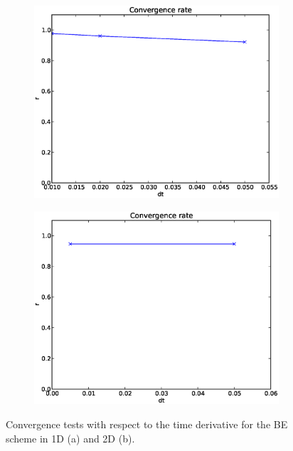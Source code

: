 \begin{figure}[h]
\centering
 \begin{subfigure}{0.49\textwidth}
  \includegraphics[width=\textwidth]{../results/experiment_14052014_0744_errorplot_BE1D/results/ConvergenceTest.eps}
  \caption{}
 \end{subfigure}
 \begin{subfigure}{0.49\textwidth}
  \includegraphics[width=\textwidth]{../results/experiment_18042014_1450_convergencetest_BE2D/results/ConvergenceTest.eps}
  \caption{}
 \end{subfigure}
 \caption[Convergence tests for BE scheme]{Convergence tests with respect to the time derivative for the BE scheme in 1D (a) and 2D (b).}
 \label{analysis:convergence_tests:BE}
\end{figure}

